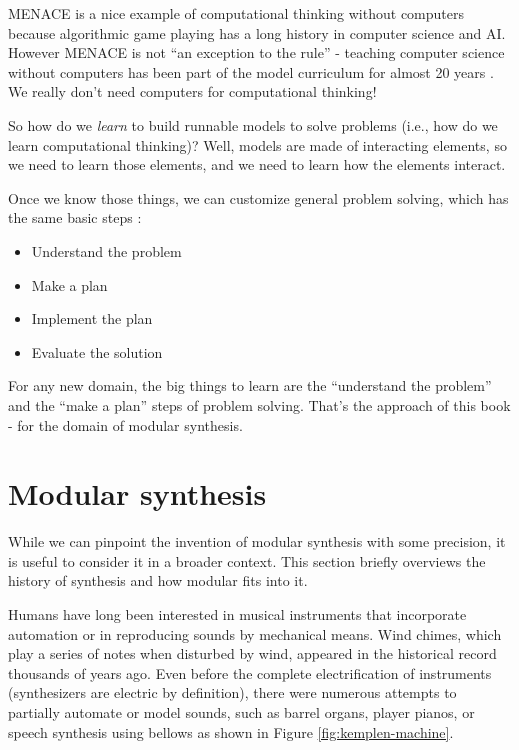 \documentclass[
]{book}
\providecommand{\tightlist}{%
  \setlength{\itemsep}{0pt}\setlength{\parskip}{0pt}}
\begin{document}
MENACE is a nice example of computational thinking without computers because algorithmic game playing has a long history in computer science and AI.
However MENACE is not ``an exception to the rule'' - teaching computer science without computers has been part of the model curriculum for almost 20 years \citep{Tucker2003, Bell2021}.
We really don't need computers for computational thinking!

So how do we \emph{learn} to build runnable models to solve problems (i.e., how do we learn computational thinking)?
Well, models are made of interacting elements, so we need to learn those elements, and we need to learn how the elements interact.

Once we know those things, we can customize general problem solving, which has the same basic steps \citep{Polya2004}:

\begin{itemize}
\tightlist
\item
  Understand the problem
\item
  Make a plan
\item
  Implement the plan
\item
  Evaluate the solution
\end{itemize}

For any new domain, the big things to learn are the ``understand the problem'' and the ``make a plan'' steps of problem solving.
That's the approach of this book - for the domain of modular synthesis.

\hypertarget{modular-synthesis}{%
\section{Modular synthesis}\label{modular-synthesis}}

While we can pinpoint the invention of modular synthesis with some precision, it is useful to consider it in a broader context.
This section briefly overviews the history of synthesis and how modular fits into it.

Humans have long been interested in musical instruments that incorporate automation or in reproducing sounds by mechanical means.
Wind chimes, which play a series of notes when disturbed by wind, appeared in the historical record thousands of years ago.
Even before the complete electrification of instruments (synthesizers are electric by definition), there were numerous attempts to partially automate or model sounds, such as barrel organs, player pianos, or speech synthesis using bellows \citep{Dudley1950} as shown in Figure \ref{fig:kemplen-machine}.
\end{document}
